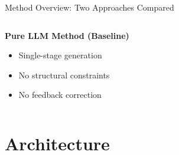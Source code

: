\documentclass[10pt,aspectratio=169]{beamer}
\begin{document}
\begin{frame}{Method Overview: Two Approaches Compared}
\begin{columns}[T]
\begin{block}{\centering \textbf{Pure LLM Method (Baseline)}}

\vspace{0.5cm}
\begin{itemize}
    \item Single-stage generation
    \item No structural constraints
    \item No feedback correction
\end{itemize}
\end{block}
\end{columns}

\end{frame}

\section{Architecture}
\end{document}
